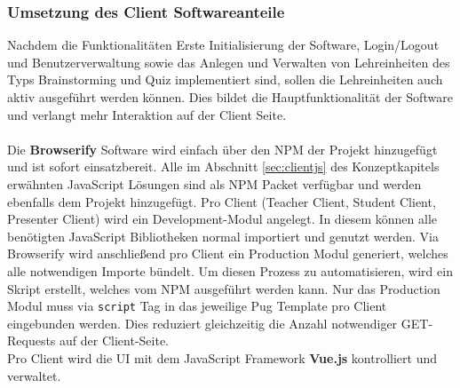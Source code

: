  \subsubsection{Umsetzung des Client Softwareanteile}\label{sec:implementclients}
Nachdem die Funktionalitäten Erste Initialisierung der Software, Login/Logout und Benutzerverwaltung sowie das Anlegen und Verwalten von Lehreinheiten des Typs Brainstorming und Quiz implementiert sind, sollen die Lehreinheiten auch aktiv ausgeführt werden können. Dies bildet die Hauptfunktionalität der Software und verlangt mehr Interaktion auf der Client Seite.\\ \\ Die \textbf{Browserify} Software wird einfach über den NPM der Projekt hinzugefügt und ist sofort einsatzbereit. Alle im Abschnitt \ref{sec:clientjs} des Konzeptkapitels erwähnten JavaScript Lösungen sind als NPM Packet verfügbar und werden ebenfalls dem Projekt hinzugefügt. Pro Client (Teacher Client, Student Client, Presenter Client) wird ein Development-Modul angelegt. In diesem können alle benötigten JavaScript Bibliotheken normal importiert und genutzt werden. 
Via Browserify wird anschließend pro Client ein Production Modul generiert, welches alle notwendigen Importe bündelt. Um diesen Prozess zu automatisieren, wird ein Skript erstellt, welches vom NPM ausgeführt werden kann. Nur das Production Modul muss via \texttt{script} Tag in das jeweilige Pug Template pro Client eingebunden werden. Dies reduziert gleichzeitig die Anzahl notwendiger GET-Requests auf der Client-Seite. \\
Pro Client wird die UI mit dem JavaScript Framework \textbf{Vue.js} kontrolliert und verwaltet. 
